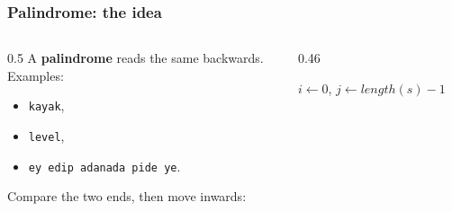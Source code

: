 \documentclass[aspectratio=169,10pt,compress]{beamer}
\begin{document}
\begin{frame}[t,fragile] \frametitle{Palindrome: the idea}
  \begin{columns}[T]
    \begin{column}{0.5\textwidth}
      \small A \textbf{palindrome} reads the same backwards.\\
      Examples:\\
	\begin{itemize}
		
		\item 
		\texttt{kayak},
		
		\item 
		\texttt{level},
		
		\item 
		\texttt{ey edip adanada pide ye}.
		
	\end{itemize}
      

      \vspace{0.4em}
      Compare the two ends, then move inwards:
      \begin{center}
      \end{center}
    \end{column}
    \begin{column}{0.46\textwidth}
      \SetAlFnt{\small}


\begin{algorithm}[H]
  \caption{IsPalindrome($s$)}
  $i \leftarrow 0$, \quad $j \leftarrow \mathit{length}(s) - 1$\;
  \;
\end{algorithm}


    \end{column}
  \end{columns}
\end{frame}
\end{document}
